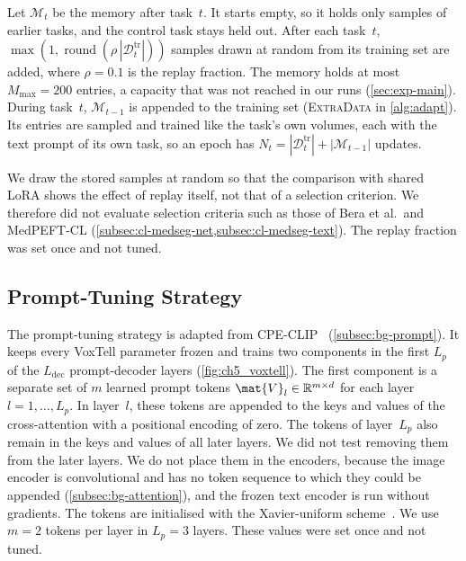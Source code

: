 Let $\mathcal{M}_t$ be the memory after task~$t$.
It starts empty, so it holds only samples of earlier tasks, and the control task stays held out.
After each task~$t$, $\max(1, \operatorname{round}(\rho \, |\mathcal{D}_t^{\mathrm{tr}}|))$ samples drawn at random from its training set are added, where $\rho = 0.1$ is the replay fraction.
The memory holds at most $M_{\max} = 200$ entries, a capacity that was not reached in our runs (\cref{sec:exp-main}).
During task~$t$, $\mathcal{M}_{t-1}$ is appended to the training set (\textsc{ExtraData} in \cref{alg:adapt}).
Its entries are sampled and trained like the task's own volumes, each with the text prompt of its own task, so an epoch has $N_t = |\mathcal{D}_t^{\mathrm{tr}}| + |\mathcal{M}_{t-1}|$ updates.

We draw the stored samples at random so that the comparison with shared LoRA shows the effect of replay itself, not that of a selection criterion.
We therefore did not evaluate selection criteria such as those of Bera et al.\ and MedPEFT-CL (\cref{subsec:cl-medseg-net,subsec:cl-medseg-text}).
The replay fraction was set once and not tuned.

\subsection{Prompt-Tuning Strategy}
\label{subsec:method-prompt}

The prompt-tuning strategy is adapted from CPE-CLIP~\cite{D_Alessandro_2023} (\cref{subsec:bg-prompt}).
It keeps every VoxTell parameter frozen and trains two components in the first $L_p$ of the $L_{\mathrm{dec}}$ prompt-decoder layers (\cref{fig:ch5_voxtell}).
The first component is a separate set of $m$ learned prompt tokens $\mat{V}_l \in \mathbb{R}^{m \times d}$ for each layer $l = 1, \dots, L_p$.
In layer~$l$, these tokens are appended to the keys and values of the cross-attention with a positional encoding of zero.
The tokens of layer~$L_p$ also remain in the keys and values of all later layers.
We did not test removing them from the later layers.
We do not place them in the encoders, because the image encoder is convolutional and has no token sequence to which they could be appended (\cref{subsec:bg-attention}), and the frozen text encoder is run without gradients.
The tokens are initialised with the Xavier-uniform scheme~\cite{glorot2010understanding}.
We use $m = 2$ tokens per layer in $L_p = 3$ layers.
These values were set once and not tuned.

